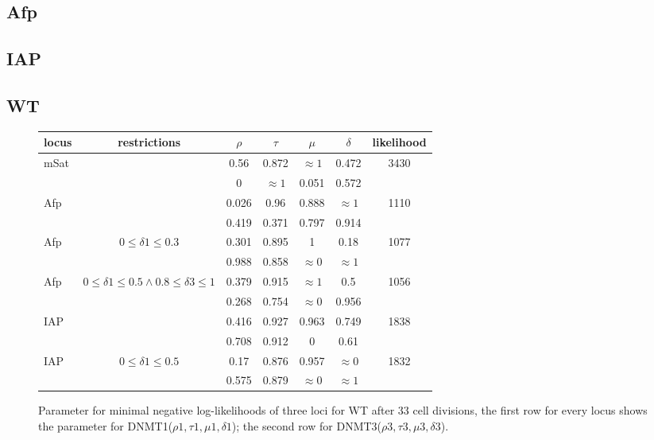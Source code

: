\subsection{Afp}
\label{Afp}

\subsection{IAP}
\label{IAP}

\subsection{WT}
\label{WT}
\begin{figure}[h]
\begin{center}
\begin{tabularx}{\textwidth}{l|c|c|c|c|c|c}
locus&	restrictions&	$\rho$&	$\tau$&	$\mu$&	$\delta$&	likelihood\\
\hline
mSat&	&	0.56&	0.872&	$\approx1$&	0.472&	3430\\
	&	&	0&	$\approx1$&	0.051&	0.572&	\\
\hline
Afp&	&	0.026&	0.96&	0.888&	$\approx1$&	1110\\
	&	&	0.419&	0.371&	0.797&	0.914&	\\
\hline
Afp&	$0 \leq \delta1 \leq 0.3$&	0.301&	0.895&	1&	0.18&	1077\\%
	&	&	0.988&	0.858&	$\approx0$&	$\approx1$&	\\
\hline
Afp&	$0 \leq \delta1 \leq 0.5 \wedge 0.8 \leq \delta3 \leq 1$&	0.379&	0.915&	$\approx1$&	0.5&	1056\\
	&	&	0.268&	0.754&	$\approx0$&	0.956&	\\
\hline
IAP&	&	0.416&	0.927&	0.963&	0.749&	1838\\%
	&	&	0.708&	0.912&	0&	0.61&	\\
\hline
IAP&	$0 \leq \delta1 \leq 0.5$&	0.17&	0.876&	0.957&	$\approx0$&	1832\\%
	&	&	0.575&	0.879&	$\approx0$&	$\approx1$&	\\
\end{tabularx}
\end{center}
\label{WT33}
\caption{Parameter for minimal negative log-likelihoods of three loci for WT after 33 cell divisions, the first row for every locus shows the parameter for DNMT1($\rho1, \tau1, \mu1, \delta1$); the second row for DNMT3($\rho3, \tau3, \mu3, \delta3$).}
\end{figure}

